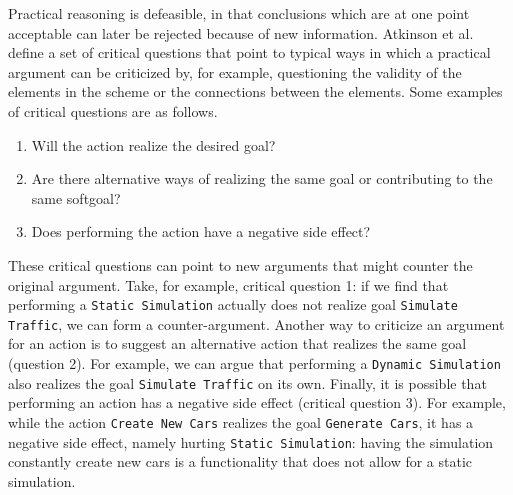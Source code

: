 Practical reasoning is defeasible, in that conclusions which are at one point acceptable can later be rejected because of new information. Atkinson et al.~\cite{atkinson2007} define a set of critical questions that point to typical ways in which a practical argument can be criticized by, for example, questioning the validity of the elements in the scheme or the connections between the elements. Some examples of critical questions are as follows.

\begin{enumerate}
\item Will the action realize the desired goal?
\item Are there alternative ways of realizing the same goal or contributing to the same softgoal?
\item Does performing the action have a negative side effect?
\end{enumerate}

These critical questions can point to new arguments that might counter the original argument. Take, for example, critical question 1: if we find that performing a \texttt{Static Simulation} actually does not realize goal \texttt{Simulate Traffic}, we can form a counter-argument. Another way to criticize an argument for an action is to suggest an alternative action that realizes the same goal (question 2). For example, we can argue that performing a \texttt{Dynamic Simulation} also realizes the goal \texttt{Simulate Traffic} on its own. Finally, it is possible that performing an action has a negative side effect (critical question 3). For example, while the action \texttt{Create New Cars} realizes the goal \texttt{Generate Cars}, it has a negative side effect, namely hurting \texttt{Static Simulation}: having the simulation constantly create new cars is a functionality that does not allow for a static simulation. 


